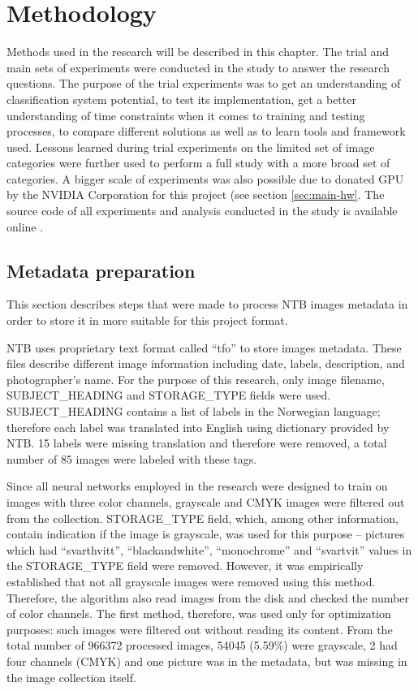 \chapter{Methodology}
\label{chap:methods}

Methods used in the research will be described in this chapter. The trial and main sets of experiments were conducted in the study to answer the research questions. The purpose of the trial experiments was to get an understanding of classification system potential, to test its implementation, get a better understanding of time constraints when it comes to training and testing processes, to compare different solutions as well as to learn tools and framework used. Lessons learned during trial experiments on the limited set of image categories were further used to perform a full study with a more broad set of categories. A bigger scale of experiments was also possible due to donated GPU by the NVIDIA Corporation for this project (see section \ref{sec:main-hw}. The source code of all experiments and analysis conducted in the study is available online \cite{master-thesis-src}.



\section{Metadata preparation}
\label{sec:metadata-prep}
This section describes steps that were made to process NTB images metadata in order to store it in more suitable for this project format.

NTB uses proprietary text format called ``tfo'' to store images metadata. These files describe different image information including date, labels, description, and photographer's name. For the purpose of this research, only image filename, SUBJECT\_HEADING and STORAGE\_TYPE fields were used. SUBJECT\_HEADING contains a list of labels in the Norwegian language; therefore each label was translated into English using dictionary provided by NTB. 15 labels were missing translation and therefore were removed, a total number of 85 images were labeled with these tags.

Since all neural networks employed in the research were designed to train on images with three color channels, grayscale and CMYK images were filtered out from the collection. STORAGE\_TYPE field, which, among other information, contain indication if the image is grayscale, was used for this purpose -- pictures which had ``svarthvitt'', ``blackandwhite'', ``monochrome'' and ``svartvit'' values in the STORAGE\_TYPE field were removed. However, it was empirically established that not all grayscale images were removed using this method. Therefore, the algorithm also read images from the disk and checked the number of color channels. The first method, therefore, was used only for optimization purposes: such images were filtered out without reading its content. From the total number of 966372 processed images, 54045 (5.59\%) were grayscale, 2 had four channels (CMYK) and one picture was in the metadata, but was missing in the image collection itself.

